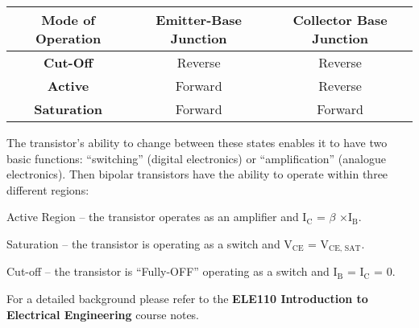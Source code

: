 \documentclass{article}
\begin{document}
\begin{center}
    \large
    \begin{tabular}{ |c| c |c| } 
    \hline
        \textbf{Mode of Operation} & \textbf{Emitter-Base Junction} & \textbf{Collector Base Junction} \\
        \hline
        \textbf{Cut-Off}& Reverse & Reverse \\
        \hline
        \textbf{Active}& Forward & Reverse \\
        \hline
        \textbf{Saturation}& Forward & Forward \\
        \hline
    \end{tabular}
\end{center}

{The transistor’s ability to change between these states enables it to have two basic 
functions: “switching” (digital electronics) or “amplification” (analogue electronics). 
Then bipolar transistors have the ability to operate within three different regions:}

\vspace{4mm}

{Active Region – the transistor operates as an amplifier and I$_\text{C}$ = $\beta$ ×I$_\text{B}$.}

{Saturation – the transistor is operating as a switch and V$_\text{CE}$ = V$_\text{CE, SAT}$.}

{Cut-off – the transistor is “Fully-OFF” operating as a switch and I$_\text{B}$ = I$_\text{C}$ = 0.}

\vspace{4mm}

{For a detailed background please refer to the \textbf{ELE110 Introduction to Electrical 
Engineering} course notes.}
\end{document}
